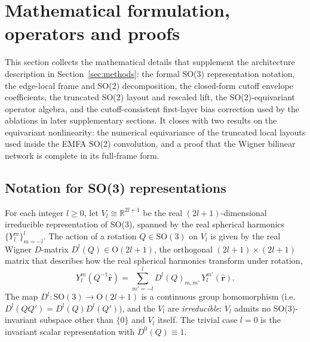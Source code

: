 \section{Mathematical formulation, operators and proofs}
\label{sec:sm-model-formulation}
\label{sec:sm-methods}

This section collects the mathematical details that supplement the architecture description in Section~\ref{sec:methods}: the formal SO(3) representation notation, the edge-local frame and SO(2) decomposition, the closed-form cutoff envelope coefficients, the truncated SO(2) layout and rescaled lift, the SO(2)-equivariant operator algebra, and the cutoff-consistent first-layer bias correction used by the ablations in later supplementary sections.
It closes with two results on the equivariant nonlinearity: the numerical equivariance of the truncated local layouts used inside the EMFA SO(2) convolution, and a proof that the Wigner bilinear network is complete in its full-frame form.

\subsection{Notation for SO(3) representations}
\label{sec:sm-representation}

For each integer $l\ge 0$, let $V_l\cong\mathbb{R}^{2l+1}$ be the real $(2l+1)$-dimensional irreducible representation of SO(3), spanned by the real spherical harmonics $\{Y_l^m\}_{m=-l}^{l}$.
The action of a rotation
$Q\in\mathrm{SO}(3)$ on $V_l$ is given by the real Wigner $D$-matrix
$D^l(Q)\in\mathrm{O}(2l+1)$, the orthogonal $(2l+1)\times(2l+1)$ matrix
that describes how the real spherical harmonics transform under rotation,
\begin{equation}
    Y_l^m(Q^{-1}\widehat{\mathbf{r}}) =\sum_{m'=-l}^{l}D^l(Q)_{m,m'}\,Y_l^{m'}(\widehat{\mathbf{r}}).
    \label{eq:sm-wigner-D}
\end{equation}
The map $D^l:\mathrm{SO}(3)\to\mathrm{O}(2l+1)$ is a continuous group homomorphism (i.e.\ $D^l(QQ')=D^l(Q)D^l(Q')$), and the $V_l$ are \emph{irreducible}: $V_l$ admits no SO(3)-invariant subspace other than $\{0\}$ and $V_l$ itself.
The trivial case $l=0$ is the invariant scalar representation with $D^0(Q)\equiv 1$.

